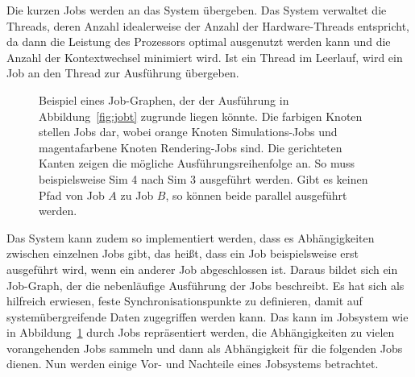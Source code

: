Die kurzen Jobs werden an das System übergeben. Das System verwaltet die Threads, deren Anzahl idealerweise der Anzahl der Hardware-Threads entspricht, da dann die Leistung des Prozessors optimal ausgenutzt werden kann und die Anzahl der Kontextwechsel minimiert wird. Ist ein Thread im Leerlauf, wird ein Job an den Thread zur Ausführung übergeben.

\begin{figure}
	\centering
	\caption[Beispiel eines Job-Graphen in einem Jobsystem.]{Beispiel eines Job-Graphen, der der Ausführung in Abbildung~\ref{fig:jobt} zugrunde liegen könnte. Die farbigen Knoten stellen Jobs dar, wobei orange Knoten Simulations-Jobs und magentafarbene Knoten Rendering-Jobs sind. Die gerichteten Kanten zeigen die mögliche Ausführungsreihenfolge an. So muss beispielsweise Sim 4 nach Sim 3 ausgeführt werden. Gibt es keinen Pfad von Job $A$ zu Job $B$, so können beide parallel ausgeführt werden.}\label{fig:jobdependencies}
\end{figure}
Das System kann zudem so implementiert werden, dass es Abhängigkeiten zwischen einzelnen Jobs gibt, das heißt, dass ein Job beispielsweise erst ausgeführt wird, wenn ein anderer Job abgeschlossen ist. Daraus bildet sich ein Job-Graph, der die nebenläufige Ausführung der Jobs beschreibt. Es hat sich als hilfreich erwiesen, feste Synchronisationspunkte zu definieren, damit auf systemübergreifende Daten zugegriffen werden kann. Das kann im Jobsystem wie in Abbildung~\ref{fig:jobdependencies} durch Jobs repräsentiert werden, die Abhängigkeiten zu vielen vorangehenden Jobs sammeln und dann als Abhängigkeit für die folgenden Jobs dienen. Nun werden einige Vor- und Nachteile eines Jobsystems betrachtet.
